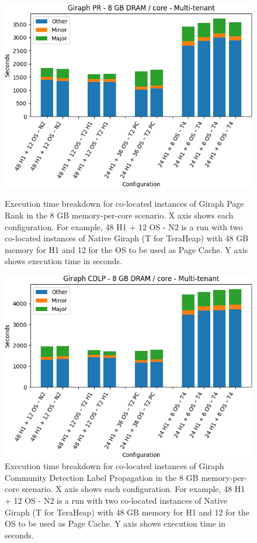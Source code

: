 \begin{figure}[thbp]
        \centering
    \includegraphics[width=\linewidth]{./fig/g_pr128.png}
    \caption{Execution time breakdown for co-located instances of Giraph
    Page Rank in the 8 GB memory-per-core scenario. X axis shows each configuration.
        For example, 48 H1 + 12 OS - N2 is a run with two co-located instances of Native Giraph (T for TeraHeap) with 48 GB memory for H1 and 12 for the OS to be used as Page Cache. Y axis shows execution time in seconds.}
    \label{fig:g_pr128}
    \includegraphics[width=\linewidth]{./fig/g_cdlp128.png}
    \caption{Execution time breakdown for co-located instances of Giraph
    Community Detection Label Propagation in the 8 GB memory-per-core scenario. X axis shows each configuration.
        For example, 48 H1 + 12 OS - N2 is a run with two co-located instances of Native Giraph (T for TeraHeap) with 48 GB memory for H1 and 12 for the OS to be used as Page Cache. Y axis shows execution time in seconds.}
    \label{fig:g_cdlp128}
\end{figure}


